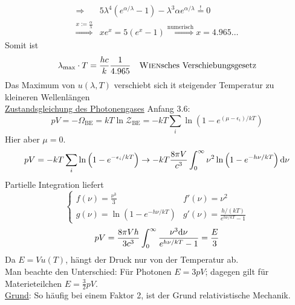 \begin{enumerate}[A)]
\begin{equation}
\begin{split}
            \Rightarrow & 5 \lambda^4 \left( e^{\alpha / \lambda} -1 \right)- \lambda^3 \alpha e^{\alpha / \lambda} \overset{!}{=} 0 \\
            \overset{x := \frac{\alpha}{\lambda}}{\Rightarrow} & x e^x = 5(e^x - 1) \overset{ \text{numerisch}}{\Rightarrow} x = 4.965\ldots
        \end{split}
    \end{equation}
    Somit ist
    \begin{equation}
        \lambda_\text{max} \cdot T = \frac{h c}{k} \frac{1}{4.965} \quad \text{\textsc{Wien}sches Verschiebungsgesetz}
    \end{equation}
    Das Maximum von $u(\lambda, T)$ verschiebt sich it steigender Temperatur zu kleineren Wellenlängen \\
    \underline{Zustandsgleichung des Photonengases}
    Anfang 3.6: %
    \begin{equation}
        p V = - \Omega_\text{BE} = k T \ln \mathcal{Z}_\text{BE} = - k T \sum_i \ln \left( 1 - e^{(\mu - \epsilon_i) / k T} \right)
    \end{equation}
    Hier aber $\mu = 0$.
    \begin{equation}
        p V =  - k T \sum_i \ln \left( 1 - e^{-\epsilon_i / k T} \right) \rightarrow - k T \frac{8 \pi V}{c^3} \int_0^\infty \nu^2 \ln \left( 1 - e^{-h \nu / k T} \right) \mathrm{d} \nu
    \end{equation}
    Partielle Integration liefert
    \begin{equation}
        \begin{cases}
            f(\nu) = \frac{\nu^3}{3} & f'(\nu) = \nu^2 \\
            g(\nu) = \ln \left( 1 - e^{-h \nu / k T} \right) & g'(\nu) = \frac{h/(kT)}{e^{h \nu / k T} - 1}
        \end{cases}
    \end{equation}
    \begin{equation}
        p V = \frac{8 \pi V h}{3 c^3} \int_0^\infty \frac{\nu^3 \mathrm{d} \nu}{e^{h \nu / k T} - 1} = \frac{E}{3}
    \end{equation}
    Da $E = V u(T)$, hängt der Druck nur von der Temperatur ab. \\
    Man beachte den Unterschied: Für Photonen $E = 3 p V$; dagegen gilt für Materieteilchen $E = \frac{3}{2} p V$. \\
    \underline{Grund}: So häufig bei einem Faktor 2, ist der Grund relativistische Mechanik. \\

\end{enumerate}
